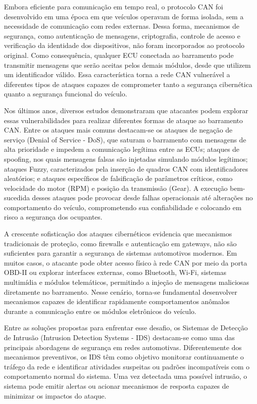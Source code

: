 Embora eficiente para comunicação em tempo real, o protocolo CAN foi desenvolvido em uma época em que veículos operavam de forma isolada, sem a necessidade de comunicação com redes externas. Dessa forma, mecanismos de segurança, como autenticação de mensagens, criptografia, controle de acesso e verificação da identidade dos dispositivos, não foram incorporados ao protocolo original. Como consequência, qualquer ECU conectada ao barramento pode transmitir mensagens que serão aceitas pelos demais módulos, desde que utilizem um identificador válido. Essa característica torna a rede CAN vulnerável a diferentes tipos de ataques capazes de comprometer tanto a segurança cibernética quanto a segurança funcional do veículo.

Nos últimos anos, diversos estudos demonstraram que atacantes podem explorar essas vulnerabilidades para realizar diferentes formas de ataque ao barramento CAN. Entre os ataques mais comuns destacam-se os ataques de negação de serviço (Denial of Service - DoS), que saturam o barramento com mensagens de alta prioridade e impedem a comunicação legítima entre as ECUs; ataques de spoofing, nos quais mensagens falsas são injetadas simulando módulos legítimos; ataques Fuzzy, caracterizados pela inserção de quadros CAN com identificadores aleatórios; e ataques específicos de falsificação de parâmetros críticos, como velocidade do motor (RPM) e posição da transmissão (Gear). A execução bem-sucedida desses ataques pode provocar desde falhas operacionais até alterações no comportamento do veículo, comprometendo sua confiabilidade e colocando em risco a segurança dos ocupantes.

A crescente sofisticação dos ataques cibernéticos evidencia que mecanismos tradicionais de proteção, como firewalls e autenticação em gateways, não são suficientes para garantir a segurança de sistemas automotivos modernos. Em muitos casos, o atacante pode obter acesso físico à rede CAN por meio da porta OBD-II ou explorar interfaces externas, como Bluetooth, Wi-Fi, sistemas multimídia e módulos telemáticos, permitindo a injeção de mensagens maliciosas diretamente no barramento. Nesse cenário, torna-se fundamental desenvolver mecanismos capazes de identificar rapidamente comportamentos anômalos durante a comunicação entre os módulos eletrônicos do veículo.

Entre as soluções propostas para enfrentar esse desafio, os Sistemas de Detecção de Intrusão (Intrusion Detection Systems - IDS) destacam-se como uma das principais abordagens de segurança em redes automotivas. Diferentemente dos mecanismos preventivos, os IDS têm como objetivo monitorar continuamente o tráfego da rede e identificar atividades suspeitas ou padrões incompatíveis com o comportamento normal do sistema. Uma vez detectada uma possível intrusão, o sistema pode emitir alertas ou acionar mecanismos de resposta capazes de minimizar os impactos do ataque.

